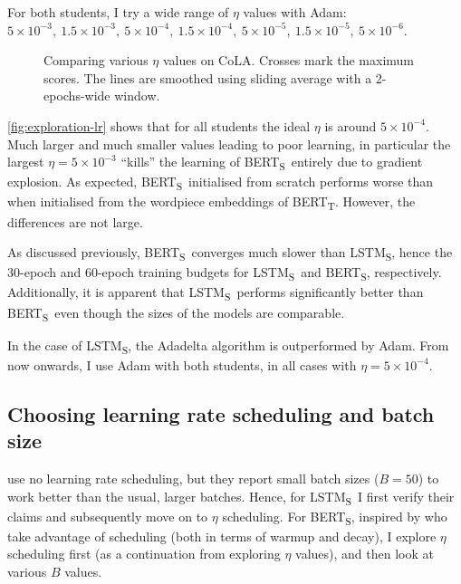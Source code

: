 \documentclass[bsc,frontabs,singlespacing,parskip,deptreport]{infthesis}
\def\BERTT{BERT\textsubscript{T}}
\def\BERTS{BERT\textsubscript{S}}
\def\LSTMS{LSTM\textsubscript{S}}
\def\sliding{The lines are smoothed using sliding average with a 2-epochs-wide window.}
\begin{document}
{{{      For both students, I try a wide range of $\eta$ values with Adam: $5\times10^{-3},\ 1.5\times10^{-3},\ 5\times10^{-4},\ 1.5\times10^{-4},\ 5\times10^{-5},\ 1.5\times10^{-5},\ 5\times10^{-6}$.
      
      \begin{figure}[h!t]
        \centering
        \caption{Comparing various $\eta$ values on CoLA. Crosses mark the maximum scores. \sliding}
        \label{fig:exploration-lr}
      \end{figure}

      \autoref{fig:exploration-lr} shows that for all students the ideal $\eta$ is around $5\times10^{-4}$. Much larger and much smaller values leading to poor learning, in particular the largest $\eta=5\times10^{-3}$ ``kills'' the learning of \BERTS~entirely due to gradient explosion.
      As expected, \BERTS~initialised from scratch performs worse than when initialised from the wordpiece embeddings of \BERTT. However, the differences are not large.

      As discussed previously, \BERTS~converges much slower than \LSTMS, hence the 30-epoch and 60-epoch training budgets for \LSTMS~and \BERTS, respectively. Additionally, it is apparent that \LSTMS~performs significantly better than \BERTS~even though the sizes of the models are comparable.

      In the case of \LSTMS, the Adadelta algorithm is outperformed by Adam. From now onwards, I use Adam with both students, in all cases with $\eta=5\times10^{-4}$.
    }

    \subsection{Choosing learning rate scheduling and batch size}{
      \citet{Tang_2019a} use no learning rate scheduling, but they report small batch sizes ($B=50$) to work better than the usual, larger batches. Hence, for \LSTMS~I first verify their claims and subsequently move on to $\eta$ scheduling. For \BERTS, inspired by \citet{Sanh_2019} who take advantage of scheduling (both in terms of warmup and decay), I explore $\eta$ scheduling first (as a continuation from exploring $\eta$ values), and then look at various $B$ values.

}}}
\end{document}
